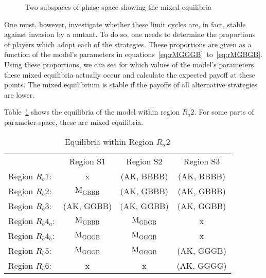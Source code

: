 \documentclass[a4paper,12pt]{article}
\numberwithin{equation}{section}
\begin{document}
\begin{figure}[h]
\begin{center}
\captionsetup[subfigure]{width=40mm}
\hspace{16mm}
\caption{Two subspaces of phase-space showing the mixed equilibria}
\label{fig:Model 1/Figure 67}
\end{center}
\end{figure}

One must, however, investigate whether these limit cycles are, in fact, stable against invasion by a mutant. To do so, one needs to determine the proportions of players which adopt each of the strategies. These proportions are given as a function of the model's parameters in equations~\ref{eq:rMGGGB}~to~\ref{eq:rMGBGB}. Using these proportions, we can see for which values of the model's parameters these mixed equilibria actually occur and calculate the expected payoff at these points. The mixed equilibrium is stable if the payoffs of all alternative strategies are lower.

Table~\ref{tab:CueGamewithObservableAmplification/EquilibriaRa2} shows the equilibria of the model within region $R_{a}2$. For some parts of parameter-space, these are mixed equilibria.

\begin{table}[h]
\begin{center}
\begin{tabular}{lccc}
 & Region S1 & Region S2 & Region S3\\
Region $R_{b}1$: & x & (AK, BBBB) & (AK, BBBB)\\
Region $R_{b}2$: & $\text{M}_{\text{GBBB}}$ & (AK, GBBB) & (AK, GBBB)\\
Region $R_{b}3$: & (AK, GGBB) & (AK, GGBB) & (AK, GGBB)\\
Region $R_{b}4_{a}$: & $\text{M}_{\text{GBBB}}$ & $\text{M}_{\text{GBGB}}$ & x\\
Region $R_{b}4_{b}$: & $\text{M}_{\text{GGGB}}$ & $\text{M}_{\text{GGGB}}$ & x\\
Region $R_{b}5$: & $\text{M}_{\text{GGGB}}$ & $\text{M}_{\text{GGGB}}$ & (AK, GGGB)\\
Region $R_{b}6$: & x& x & (AK, GGGG)
\end{tabular}
\end{center}
\caption{Equilibria within Region $R_{a}2$}
\label{tab:CueGamewithObservableAmplification/EquilibriaRa2}
\end{table}
\end{document}
